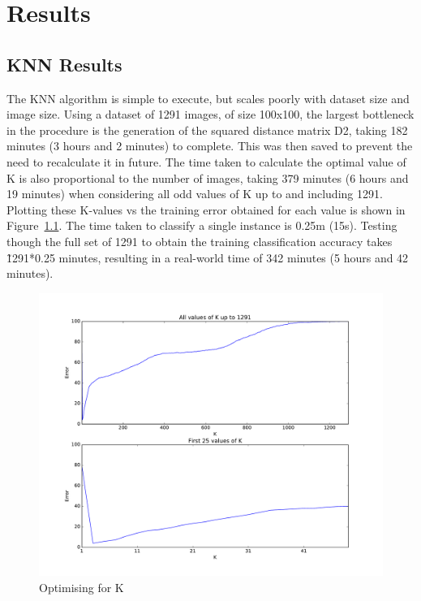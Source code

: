 \chapter{Results}


\section{KNN Results}
The KNN algorithm is simple to execute, but scales poorly with dataset size and image size. Using a dataset of 1291 images, of size 100x100, the largest bottleneck in the procedure is the generation of the squared distance matrix D2, taking 182 minutes (3 hours and 2 minutes) to complete. This was then saved to prevent the need to recalculate it in future. The time taken to calculate the optimal value of K is also proportional to the number of images, taking 379 minutes (6 hours and 19 minutes) when considering all odd values of K up to and including 1291. Plotting these K-values vs the training error obtained for each value is shown in Figure~\ref{fig:k_values}. The time taken to classify a single instance is 0.25m (15s). Testing though the full set of 1291 to obtain the training classification accuracy takes \~1291*0.25 minutes, resulting in a real-world time of 342 minutes (5 hours and 42 minutes). 

\begin{figure}
	\centering
	\includegraphics[width=\textwidth]{figures/k_values1291}
	\caption{Optimising for K}
	\label{fig:k_values}
	\centering
\end{figure}


